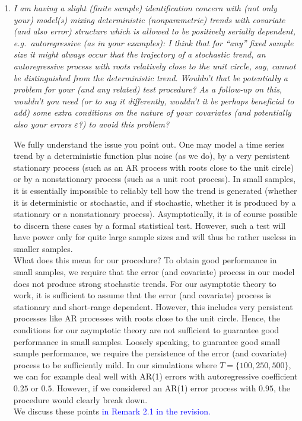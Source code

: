 \documentclass[a4paper,12pt]{article}
\begin{document}
\begin{enumerate}[label=\arabic*.,leftmargin=0.6cm]
\item \textit{I am having a slight (finite sample) identification concern with (not only your) model(s) mixing deterministic (nonparametric) trends with covariate (and also error) structure which is allowed to be positively serially dependent, e.g.\ autoregressive (as in your examples): I think that for ``any'' fixed sample size it might always occur that the trajectory of a stochastic trend, an autoregressive process with roots relatively close to the unit circle, say, cannot be distinguished from the deterministic trend. Wouldn't that be potentially a problem for your (and any related) test procedure? As a follow-up on this, wouldn't you need (or to say it differently, wouldn't it be perhaps beneficial to add) some extra conditions on the nature of your covariates (and potentially also your errors $\varepsilon$?) to avoid this problem?}

We fully understand the issue you point out. One may model a time series trend by a deterministic function plus noise (as we do), by a very persistent stationary process (such as an AR process with roots close to the unit circle) or by a nonstationary process (such as a unit root process). In small samples, it is essentially impossible to reliably tell how the trend is generated (whether it is deterministic or stochastic, and if stochastic, whether it is produced by a stationary or a nonstationary process). Asymptotically, it is of course possible to discern these cases by a formal statistical test. However, such a test will have power only for quite large sample sizes and will thus be rather useless in smaller samples. \\
What does this mean for our procedure? To obtain good performance in small samples, we require that the error (and covariate) process in our model does not produce strong stochastic trends. For our asymptotic theory to work, it is sufficient to assume that the error (and covariate) process is stationary and short-range dependent. However, this includes very persistent processes like AR processes with roots close to the unit circle. Hence, the conditions for our asymptotic theory are not sufficient to guarantee good performance in small samples. Loosely speaking, to guarantee good small sample performance, we require the persistence of the error (and covariate) process to be sufficiently mild. In our simulations where $T=\{100,250,500\}$, we can for example deal well with AR(1) errors with autoregressive coefficient $0.25$ or $0.5$. However, if we considered an AR(1) error process with $0.95$, the procedure would clearly break down. \\
We discuss these points \textcolor{blue}{in Remark 2.1 in the revision.}


\end{enumerate}
\end{document}
